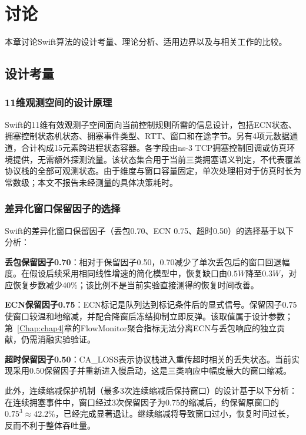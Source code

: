 \chapter{讨论}\label{Chap:chap5}

本章讨论Swift算法的设计考量、理论分析、适用边界以及与相关工作的比较。

\section{设计考量}

\subsection{11维观测空间的设计原理}

Swift的11维有效观测子空间面向当前控制规则所需的信息设计，包括ECN状态、拥塞控制状态机状态、拥塞事件类型、RTT、窗口和在途字节。另有4项元数据通道，合计构成15元素跨进程状态容器。各字段由ns-3 TCP拥塞控制回调或仿真环境提供，无需额外探测流量。该状态集合用于当前三类拥塞语义判定，不代表覆盖协议栈的全部可观测状态。由于维度与窗口容量固定，单次处理相对于仿真时长为常数级；本文不报告未经测量的具体决策耗时。

\subsection{差异化窗口保留因子的选择}

Swift的差异化窗口保留因子（丢包0.70、ECN 0.75、超时0.50）的选择基于以下分析：

\textbf{丢包保留因子0.70}：相对于保留因子0.50，0.70减少了单次丢包后的窗口回退幅度。在假设后续采用相同线性增速的简化模型中，恢复缺口由$0.5W$降至$0.3W$，对应恢复步数减少40\%；该比例不是当前实验直接测得的恢复时间改善。

\textbf{ECN保留因子0.75}：ECN标记是队列达到标记条件后的显式信号。保留因子0.75使窗口较温和地缩减，并配合降窗后冻结抑制立即反弹。该取值属于设计参数；第~\ref{Chap:chap4}章的FlowMonitor聚合指标无法分离ECN与丢包响应的独立贡献，仍需消融实验验证。

\textbf{超时保留因子0.50}：CA\_LOSS表示协议栈进入重传超时相关的丢失状态。当前实现采用0.50保留因子并重新进入慢启动，这是三类响应中幅度最大的窗口缩减。

此外，连续缩减保护机制（最多3次连续缩减后保持窗口）的设计基于以下分析：在连续拥塞事件中，窗口经过3次保留因子为0.75的缩减后，约保留原窗口的$0.75^3 \approx 42.2\%$，已经完成显著退让。继续缩减将导致窗口过小，恢复时间过长，反而不利于整体吞吐量。

